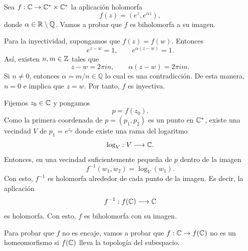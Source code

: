 	\begin{example}
		Sea $f:\mathbb{C}\to\mathbb{C}^*\times\mathbb{C}^*$ la aplicación holomorfa
		\begin{equation*}
			f(z)=(e^z,e^{\alpha z}),
		\end{equation*}
		donde $\alpha\in\mathbb{R}\setminus\mathbb{Q}$. Vamos a probar que $f$ es biholomorfa a su imagen. 
		
		Para la inyectividad, supongamos que $f(z)=f(w)$. Entonces
		\begin{equation*}
			e^{z-w}=1,\qquad e^{\alpha(z-w)}=1.
		\end{equation*}
		Así, existen $n,m\in \mathbb{Z}$ tales que
		\begin{equation*}
			z-w=2\pi i n,\qquad \alpha(z-w)=2\pi im.
		\end{equation*}
		Si $n\neq 0$, entonces $\alpha=m/n\in\mathbb{Q}$ lo cual es una contradicción. De esta manera, $n=0$ e implica que $z=w$. Por tanto, $f$ es inyectiva.
		
		Fijemos $z_0\in\mathbb{C}$ y pongamos
		\begin{equation*}
			p=f(z_0).
		\end{equation*}
		Como la primera coordenada de $p=(p_1,p_2)$ es un punto en $\mathbb{C}^*$, existe una vecindad $V$ de $p_1=e^{z_0}$ donde existe una rama del logaritmo
		\begin{equation*}
			\log_V:V\longrightarrow\mathbb{C}.
		\end{equation*}
		Entonces, en una vecindad suficientemente pequeña de $p$ dentro de la imagen
		\begin{equation*}
			f^{-1}(w_1,w_2)=\log_V(w_1).
		\end{equation*}
		Con esto, $f^{-1}$ es holomorfa alrededor de cada punto de la imagen. Es decir, la aplicación
		\begin{equation*}
			f^{-1}:f(\mathbb{C})\longrightarrow\mathbb{C}
		\end{equation*}
		es holomorfa. Con esto, $f$ es biholomorfa con su imagen. 
		
		Para probar que $f$ no es encaje, vamos a probar que $f:\mathbb{C}\to f(\mathbb{C})$ no es un homeomorfismo si $f(\mathbb{C})$ lleva la topología del subespacio. 
		

\end{example}

